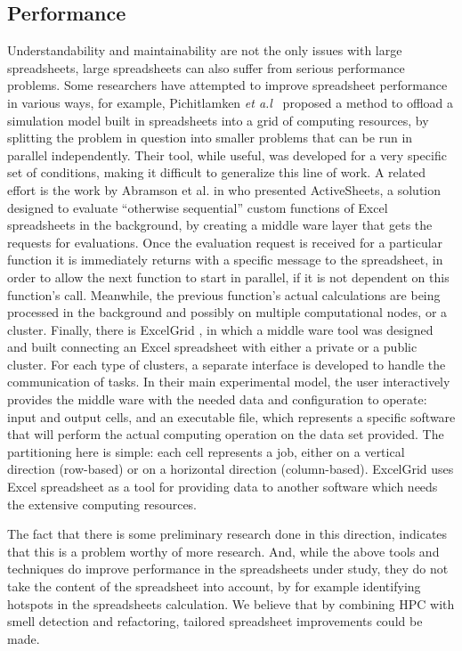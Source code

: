 \documentclass[conference]{IEEEtran}
\begin{document}
\subsection{Performance}
Understandability and maintainability are not the only issues with large spreadsheets, large spreadsheets can also suffer from serious performance problems. Some researchers have attempted to improve spreadsheet performance in various ways, for example, Pichitlamken \emph{et a.l}~\cite{7_pichitlamken_kajkamhaeng_uthayopas_kaewpuang_2010} proposed a method to offload a simulation model built in spreadsheets into a grid of computing resources, by splitting the problem in question into smaller problems that can be run in parallel independently. Their tool, while useful, was developed for a very specific set of conditions, making it difficult to generalize this line of work. A related effort is the work by Abramson et al. in \cite{6_abramson_roe_kotler_mather_2001} who presented ActiveSheets, a solution designed to evaluate ``otherwise sequential'' custom functions of Excel spreadsheets in the background, by creating a middle ware layer that gets the requests for evaluations. Once the evaluation request is received for a particular function it is immediately returns with a specific message to the spreadsheet, in order to allow the next function to start in parallel, if it is not dependent on this function's call. Meanwhile, the previous function's actual calculations are being processed in the background and possibly on multiple computational nodes, or a cluster. Finally, there is ExcelGrid \cite{10_nadiminti_chiu_teoh_luther_venugopal_buyya_2004}, in which a middle ware tool was designed and built connecting an Excel spreadsheet with either a private or a public cluster. For each type of clusters, a separate interface is developed to handle the communication of tasks. In their main experimental model, the user interactively provides the middle ware with the needed data and configuration to operate: input and output cells, and an executable file, which represents a specific software that will perform the actual computing operation on the data set provided. The partitioning here is simple: each cell represents a job, either on a vertical direction (row-based) or on a horizontal direction (column-based). ExcelGrid uses Excel spreadsheet as a tool for providing data to another software which needs the extensive computing resources. 

The fact that there is some preliminary research done in this direction, indicates that this is a problem worthy of more research. And, while the above tools and techniques do improve performance in the spreadsheets under study, they do not take the content of the spreadsheet into account, by for example identifying hotspots in the spreadsheets calculation. We believe that by combining HPC with smell detection and refactoring, tailored spreadsheet improvements could be made.
\end{document}
